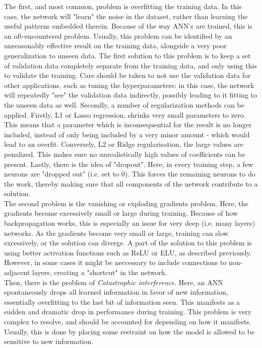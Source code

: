 The first, and most common, problem is overfitting the training data. In this case, the network will "learn" the noise in the dataset, rather than learning the useful patterns embedded therein. Because of the way ANN's are trained, this is an oft-encountered problem. Usually, this problem can be identified by an unreasonably effective result on the training data, alongside a very poor generalization to unseen data. The first solution to this problem is to keep a set of validation data completely separate from the training data, and only using this to validate the training. Care should be taken to not use the validation data for other applications, such as tuning the hyperparameters: in this case, the network will repeatedly "see" the validation data indirectly, possibly leading to it fitting to the unseen data as well. Secondly, a number of regularization methods can be applied. Firstly, L1 or Lasso regression, shrinks very small parameters to zero. This means that a parameter which is inconsequential for the result is no longer included, instead of only being included by a very minor amount - which would lead to an overfit. Conversely, L2 or Ridge regularisation, the large values are penalized. This makes sure no unrealistically high values of coefficients can be present. Lastly, there is the idea of "dropout". Here, in every training step, a few neurons are "dropped out" (i.e. set to 0). This forces the remaining neurons to do the work, thereby making sure that all components of the network contribute to a solution.\\

The second problem is the vanishing or exploding gradients problem. Here, the gradients become excessively small or large during training. Because of how backpropagation works, this is especially an issue for very deep (i.e. many layers) networks. As the gradients become very small or large, training can slow excessively, or the solution can diverge. A part of the solution to this problem is using better activation functions such as ReLU or ELU, as described previously. However, in some cases it might be neccessary to include connections to non-adjacent layers, creating a "shortcut" in the network. \\

Then, there is the problem of \textit{Catastrophic interference}. Here, an ANN spontaneously drops all learned information in favor of new information, essentially overfitting to the last bit of information seen. This manifests as a sudden and dramatic drop in performance during training. This problem is very complex to resolve, and should be accounted for depending on how it manifests. Usually, this is done by placing some restraint on how the model is allowed to be sensitive to new information.\\

